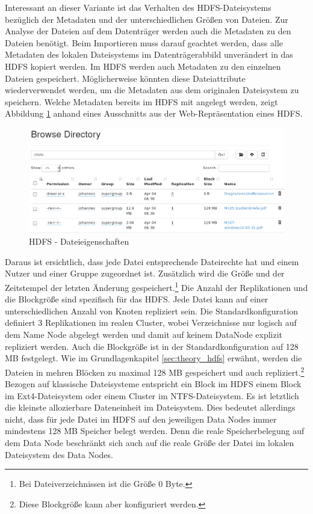 \noindent
Interessant an dieser Variante ist das Verhalten des HDFS-Dateisystems bezüglich der Metadaten und der unterschiedlichen Größen von Dateien. Zur Analyse der Dateien auf dem Datenträger werden auch die Metadaten zu den Dateien benötigt. Beim Importieren muss darauf geachtet werden, dass alle Metadaten des lokalen Dateisystems im Datenträgerabbild unverändert in das HDFS kopiert werden. Im HDFS werden auch Metadaten zu den einzelnen Dateien gespeichert. Möglicherweise könnten diese Dateiattribute wiederverwendet werden, um die Metadaten aus dem originalen Dateisystem zu speichern.
Welche Metadaten bereits im HDFS mit angelegt werden, zeigt Abbildung \ref{fig:hdfs_file_properties} anhand eines Ausschnitts aus der Web-Repräsentation eines HDFS.\\
\begin{figure}[ht]
  \centering
  \includegraphics[width=\textwidth]{./resource/HDFS_FS_Example.png}
  \caption{HDFS - Dateieigenschaften}
  \label{fig:hdfs_file_properties}
\end{figure}

\noindent
Daraus ist ersichtlich, dass jede Datei entsprechende Dateirechte hat und einem Nutzer und einer Gruppe zugeordnet ist. Zusätzlich wird die Größe und der Zeitstempel der letzten Änderung gespeichert.\footnote{Bei Dateiverzeichnissen ist die Größe 0 Byte.} Die Anzahl der Replikationen und die Blockgröße sind spezifisch für das HDFS. Jede Datei kann auf einer unterschiedlichen Anzahl von Knoten repliziert sein. Die Standardkonfiguration definiert 3 Replikationen im realen Cluster, wobei Verzeichnisse nur logisch auf dem Name Node abgelegt werden und damit auf keinem DataNode explizit repliziert werden. Auch die Blockgröße ist in der Standardkonfiguration auf 128 MB festgelegt. Wie im Grundlagenkapitel \ref{sec:theory_hdfs} erwähnt, werden die Dateien in mehren Blöcken zu maximal 128 MB gespeichert und auch repliziert.\footnote{Diese Blockgröße kann aber konfiguriert werden.}\\
Bezogen auf klassische Dateisysteme entspricht ein Block im HDFS einem Block im Ext4-Dateisystem oder einem Cluster im NTFS-Dateisystem. Es ist letztlich die kleinste allozierbare Dateneinheit im Dateisystem.\cite[S.129-140]{filesystem_forensic} Dies bedeutet allerdings nicht, dass für jede Datei im HDFS auf den jeweiligen Data Nodes immer mindestens 128 MB Speicher belegt werden. Denn die reale Speicherbelegung auf dem Data Node beschränkt sich auch auf die reale Größe der Datei im lokalen Dateisystem des Data Nodes.\cite[S. 16-17]{professional_hadoop}\\

